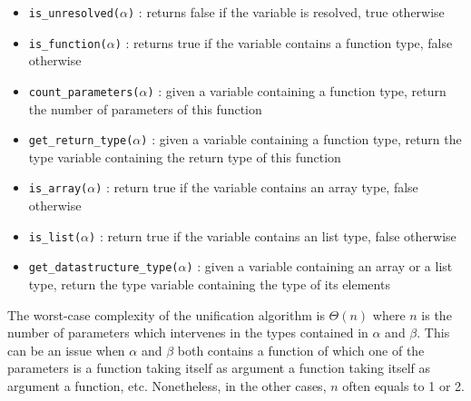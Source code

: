 \documentclass[a4paper,11pt]{article}
\begin{document}
\begin{itemize}
	\item \texttt{is\_unresolved($\alpha$)} : returns false if the variable is resolved, true otherwise
	\item \texttt{is\_function($\alpha$)} : returns true if the variable contains a function type, false otherwise
	\item \texttt{count\_parameters($\alpha$)} : given a variable containing a function type, return the number of parameters of this function
	\item \texttt{get\_return\_type($\alpha$)} : given a variable containing a function type, return the type variable containing the return type of this function
	\item \texttt{is\_array($\alpha$)} : return true if the variable contains an array type, false otherwise
	\item \texttt{is\_list($\alpha$)} : return true if the variable contains an list type, false otherwise
	\item \texttt{get\_datastructure\_type($\alpha$)} : given a variable containing an array or a list type, return the type variable containing the type of its elements
\end{itemize}
The worst-case complexity of the unification algorithm is $\Theta(n)$ where $n$ is the number of parameters which intervenes in the types contained in $\alpha$ and $\beta$. This can be an issue when $\alpha$ and $\beta$ both contains a function of which one of the parameters is a function taking itself as argument a function taking itself as argument a function, etc. Nonetheless, in the other cases, $n$ often equals to 1 or 2.
\end{document}
